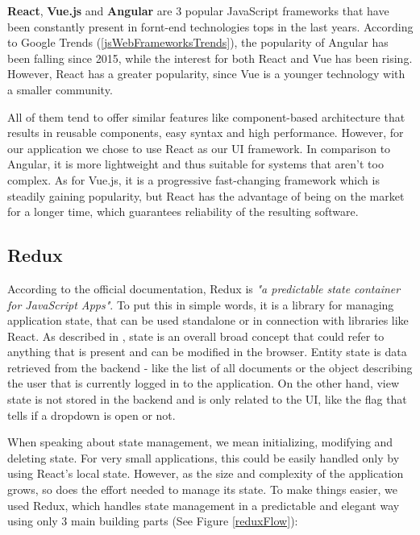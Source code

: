 \textbf{React}, \textbf{Vue.js} and \textbf{Angular} are 3 popular JavaScript frameworks that have been constantly present in fornt-end technologies tops in the last years. According to Google Trends (\ref{jsWebFrameworksTrends}), the popularity of Angular has been falling since 2015, while the interest for both React and Vue has been rising. However, React has a greater popularity, since Vue is a younger technology with a smaller community.

All of them tend to offer similar features like component-based architecture that results in reusable components, easy syntax and high performance. However, for our application we chose to use React as our UI framework. In comparison to Angular, it is more lightweight and thus suitable for systems that aren't too complex. As for Vue.js, it is a progressive fast-changing framework which is steadily gaining popularity, but React has the advantage of being on the market for a longer time, which guarantees reliability of the resulting software.


\subsection{Redux}
\label{section:redux}

According to the official documentation, Redux is \textit{"a predictable state container for JavaScript Apps"}. To put this in simple words, it is a library for managing application state, that can be used standalone or in connection with libraries like React. As described in \cite{tamingTheStateInReact}, state is an overall broad concept that could refer to anything that is present and can be modified in the browser. Entity state is data retrieved from the backend - like the list of all documents or the object describing the user that is currently logged in to the application. On the other hand, view state is not stored in the backend and is only related to the UI, like the flag that tells if a dropdown is open or not.

When speaking about state management, we mean initializing, modifying and deleting state. For very small applications, this could be easily handled only by using React's local state. However, as the size and complexity of the application grows, so does the effort needed to manage its state. To make things easier, we used Redux, which handles state management in a predictable and elegant way using only 3 main building parts (See Figure \ref{reduxFlow}):

